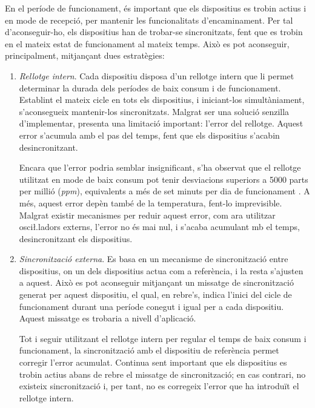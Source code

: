 \documentclass{tfgitic}[2024/07/01]
\begin{document}
{En el període de funcionament, és important que els dispositius es trobin actius i en mode de recepció, per mantenir les funcionalitats d'encaminament. Per tal d'aconseguir-ho, els dispositius han de trobar-se sincronitzats, fent que es trobin en el mateix estat de funcionament al mateix temps. Això es pot aconseguir, principalment, mitjançant dues estratègies:
\begin{enumerate}
    \item \emph{Rellotge intern}. Cada dispositiu disposa d'un rellotge intern que li permet determinar la durada dels períodes de baix consum i de funcionament. Establint el mateix cicle en tots els dispositius, i iniciant-los simultàniament, s'aconsegueix mantenir-los sincronitzats. Malgrat ser una solució senzilla d'implementar, presenta una limitació important: l'error del rellotge. Aquest error s'acumula amb el pas del temps, fent que els dispositius s'acabin desincronitzant.
    
    Encara que l'error podria semblar insignificant, s'ha observat que el rellotge utilitzat en mode de baix consum pot tenir desviacions superiors a 5000 parts per millió (\emph{ppm}), equivalents a més de set minuts per dia de funcionament \cite{nikki_smith_esp32_2022}. A més, aquest error depèn també de la temperatura, fent-lo imprevisible. Malgrat existir mecanismes per reduir aquest error, com ara utilitzar osci\l.ladors externs, l'error no és mai nul, i s'acaba acumulant mb el temps, desincronitzant els dispositius.
    
    \item \emph{Sincronització externa}. Es basa en un mecanisme de sincronització entre dispositius, on un dels dispositius actua com a referència, i la resta s'ajusten a aquest. Això es pot aconseguir mitjançant un missatge de sincronització generat per aquest dispositiu, el qual, en rebre's, indica l'inici del cicle de funcionament durant una període conegut i igual per a cada dispositiu. Aquest missatge es trobaria a nivell d'aplicació. 
    
    Tot i seguir utilitzant el rellotge intern per regular el temps de baix consum i funcionament, la sincronització amb el dispositiu de referència permet corregir l'error acumulat. 
    Continua sent important que els dispositius es trobin actius abans de rebre el missatge de sincronització; en cas contrari, no existeix sincronització i, per tant, no es corregeix l'error que ha introduït el rellotge intern.
\end{enumerate}

}
\end{document}
